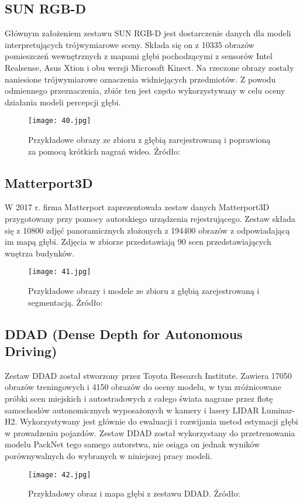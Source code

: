 \subsection{SUN RGB-D}
Głównym założeniem zestawu SUN RGB-D \cite{song2015} jest dostarczenie danych dla modeli interpretujących trójwymiarowe sceny. Składa się on z 10335 obrazów pomieszczeń wewnętrznych z mapami głębi pochodzącymi z sensorów Intel Realsense, Asus Xtion i obu wersji Microsoft Kinect. Na rzeczone obrazy zostały naniesione trójwymiarowe oznaczenia widniejących przedmiotów. Z powodu odmiennego przeznaczenia, zbiór ten jest często wykorzystywany w celu oceny działania modeli percepcji głębi.
\begin{figure}[H]
    \centering
    \texttt{[image: 40.jpg]}
    \caption{Przykładowe obrazy ze zbioru z głębią zarejestrowaną i poprawioną za pomocą krótkich nagrań wideo. Źródło: \cite{song2015}}
    \label{fig:sunrgbd-comparison}
\end{figure}

\subsection{Matterport3D}
W 2017 r. firma Matterport zaprezentowała zestaw danych Matterport3D \cite{chang2017} przygotowany przy pomocy autorskiego urządzenia rejestrującego. Zestaw składa się z 10800 zdjęć panoramicznych złożonych z 194400 obrazów z odpowiadającą im mapą głębi. Zdjęcia w zbiorze przedstawiają 90 scen przedstawiających wnętrza budynków.
\begin{figure}[H]
    \centering
    \texttt{[image: 41.jpg]}
    \caption{Przykładowe obrazy i modele ze zbioru z głębią zarejestrowaną i segmentacją. Źródło: \cite{chang2017}}
    \label{fig:matterport3d-example}
\end{figure} 

\subsection{DDAD (Dense Depth for Autonomous Driving)}
Zestaw DDAD \cite{guizilini2020} został stworzony przez Toyota Research Institute. Zawiera 17050 obrazów treningowych i 4150 obrazów do oceny modelu, w tym zróżnicowane próbki scen miejskich i autostradowych z całego świata nagrane przez flotę samochodów autonomicznych wyposażonych w kamery i lasery LIDAR Luminar-H2. Wykorzystywany jest głównie do ewaluacji i rozwijania metod estymacji głębi w prowadzeniu pojazdów. Zestaw DDAD został wykorzystany do przetrenowania modelu PackNet tego samego autorstwa, nie osiąga on jednak wyników porównywalnych do wybranych w niniejszej pracy modeli.
\begin{figure}[H]
    \centering
    \texttt{[image: 42.jpg]}
    \caption{Przykładowy obraz i mapa głębi z zestawu DDAD. Źródło: \cite{guizilini2020}}
    \label{fig:ddad-example}
\end{figure} 

